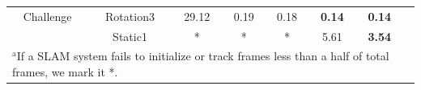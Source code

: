 \documentclass[conference]{IEEEtran}
\begin{document}
\begin{table}[h]
\begin{tabular}{cccccccc}
			{Challenge}&{Rotation3}&  {29.12}  & {0.19}  & {0.18}  & {\textbf{0.14}} & {\textbf{0.14}}  \\	
	
			
			{}&{Static1}&  {*}  & {*}  & {*}  & {5.61} & {\textbf{3.54}}  \\

		

			\hline
			\multicolumn{7}{l}{$^{\mathrm{a}}$If a SLAM system fails to initialize or track frames less than a half of total frames, we mark it *.}
			
		\end{tabular}
	\end{table}






			
			

			

			
		
			
			
			

			
			
			
\end{document}
